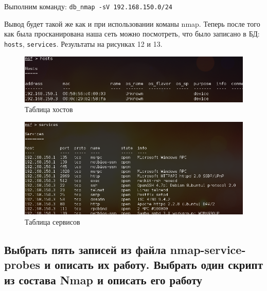 \documentclass[11pt, a4paper]{article}		%
\begin{document}
Выполним команду: \verb'db_nmap -sV 192.168.150.0/24'

Вывод будет такой же как и при использовании команы nmap. Теперь после того как была просканирована наша сеть можно посмотреть, что было записано в БД: \verb'hosts', \verb'services'. Результаты на рисунках 12 и 13.

\begin{figure}[h!]
\centering
\includegraphics[scale=0.8]{res/msf_hosts}
\caption{Таблица хостов}
\end{figure}

\begin{figure}[h!]
\centering
\includegraphics[scale=0.8]{res/msf_services}
\caption{Таблица сервисов}
\end{figure}


\subsection{Выбрать пять записей из файла nmap-service-probes и описать их работу. Выбрать один скрипт из состава Nmap и описать его работу}
\end{document}
